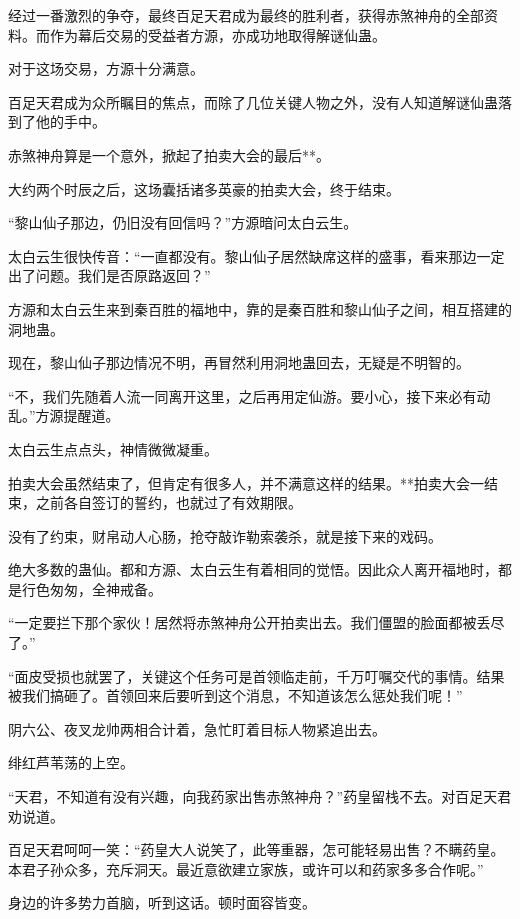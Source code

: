 
\begin{this_body}

经过一番激烈的争夺，最终百足天君成为最终的胜利者，获得赤煞神舟的全部资料。而作为幕后交易的受益者方源，亦成功地取得解谜仙蛊。

对于这场交易，方源十分满意。

百足天君成为众所瞩目的焦点，而除了几位关键人物之外，没有人知道解谜仙蛊落到了他的手中。

赤煞神舟算是一个意外，掀起了拍卖大会的最后**。

大约两个时辰之后，这场囊括诸多英豪的拍卖大会，终于结束。

“黎山仙子那边，仍旧没有回信吗？”方源暗问太白云生。

太白云生很快传音：“一直都没有。黎山仙子居然缺席这样的盛事，看来那边一定出了问题。我们是否原路返回？”

方源和太白云生来到秦百胜的福地中，靠的是秦百胜和黎山仙子之间，相互搭建的洞地蛊。

现在，黎山仙子那边情况不明，再冒然利用洞地蛊回去，无疑是不明智的。

“不，我们先随着人流一同离开这里，之后再用定仙游。要小心，接下来必有动乱。”方源提醒道。

太白云生点点头，神情微微凝重。

拍卖大会虽然结束了，但肯定有很多人，并不满意这样的结果。**拍卖大会一结束，之前各自签订的誓约，也就过了有效期限。

没有了约束，财帛动人心肠，抢夺敲诈勒索袭杀，就是接下来的戏码。

绝大多数的蛊仙。都和方源、太白云生有着相同的觉悟。因此众人离开福地时，都是行色匆匆，全神戒备。

“一定要拦下那个家伙！居然将赤煞神舟公开拍卖出去。我们僵盟的脸面都被丢尽了。”

“面皮受损也就罢了，关键这个任务可是首领临走前，千万叮嘱交代的事情。结果被我们搞砸了。首领回来后要听到这个消息，不知道该怎么惩处我们呢！”

阴六公、夜叉龙帅两相合计着，急忙盯着目标人物紧追出去。

绯红芦苇荡的上空。

“天君，不知道有没有兴趣，向我药家出售赤煞神舟？”药皇留栈不去。对百足天君劝说道。

百足天君呵呵一笑：“药皇大人说笑了，此等重器，怎可能轻易出售？不瞒药皇。本君子孙众多，充斥洞天。最近意欲建立家族，或许可以和药家多多合作呢。”

身边的许多势力首脑，听到这话。顿时面容皆变。


\end{this_body}
